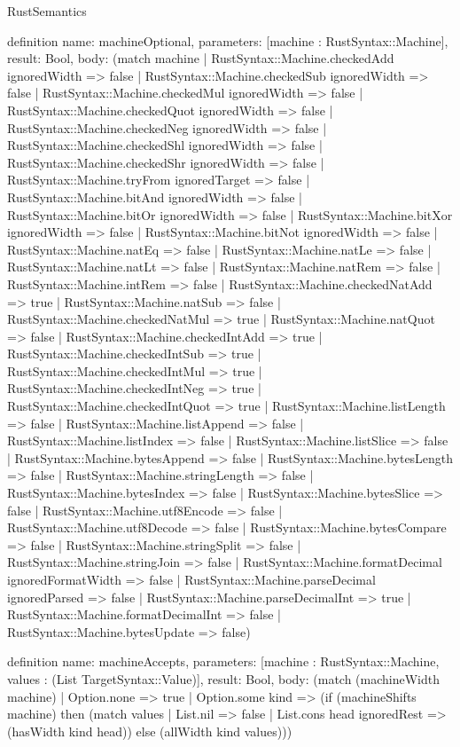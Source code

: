 \begin{lexlean}{RustSemantics}
\begin{semanticmodule}
definition{
  name: machineOptional,
  parameters: [machine : RustSyntax::Machine],
  result: Bool,
  body: (match machine
    | RustSyntax::Machine.checkedAdd ignoredWidth => false
    | RustSyntax::Machine.checkedSub ignoredWidth => false
    | RustSyntax::Machine.checkedMul ignoredWidth => false
    | RustSyntax::Machine.checkedQuot ignoredWidth => false
    | RustSyntax::Machine.checkedNeg ignoredWidth => false
    | RustSyntax::Machine.checkedShl ignoredWidth => false
    | RustSyntax::Machine.checkedShr ignoredWidth => false
    | RustSyntax::Machine.tryFrom ignoredTarget => false
    | RustSyntax::Machine.bitAnd ignoredWidth => false
    | RustSyntax::Machine.bitOr ignoredWidth => false
    | RustSyntax::Machine.bitXor ignoredWidth => false
    | RustSyntax::Machine.bitNot ignoredWidth => false
    | RustSyntax::Machine.natEq => false
    | RustSyntax::Machine.natLe => false
    | RustSyntax::Machine.natLt => false
    | RustSyntax::Machine.natRem => false
    | RustSyntax::Machine.intRem => false
    | RustSyntax::Machine.checkedNatAdd => true
    | RustSyntax::Machine.natSub => false
    | RustSyntax::Machine.checkedNatMul => true
    | RustSyntax::Machine.natQuot => false
    | RustSyntax::Machine.checkedIntAdd => true
    | RustSyntax::Machine.checkedIntSub => true
    | RustSyntax::Machine.checkedIntMul => true
    | RustSyntax::Machine.checkedIntNeg => true
    | RustSyntax::Machine.checkedIntQuot => true
    | RustSyntax::Machine.listLength => false
    | RustSyntax::Machine.listAppend => false
    | RustSyntax::Machine.listIndex => false
    | RustSyntax::Machine.listSlice => false
    | RustSyntax::Machine.bytesAppend => false
    | RustSyntax::Machine.bytesLength => false
    | RustSyntax::Machine.stringLength => false
    | RustSyntax::Machine.bytesIndex => false
    | RustSyntax::Machine.bytesSlice => false
    | RustSyntax::Machine.utf8Encode => false
    | RustSyntax::Machine.utf8Decode => false
    | RustSyntax::Machine.bytesCompare => false
    | RustSyntax::Machine.stringSplit => false
    | RustSyntax::Machine.stringJoin => false
    | RustSyntax::Machine.formatDecimal ignoredFormatWidth => false
    | RustSyntax::Machine.parseDecimal ignoredParsed => false
    | RustSyntax::Machine.parseDecimalInt => true
    | RustSyntax::Machine.formatDecimalInt => false
    | RustSyntax::Machine.bytesUpdate => false)
}

definition{
  name: machineAccepts,
  parameters: [machine : RustSyntax::Machine, values : (List TargetSyntax::Value)],
  result: Bool,
  body: (match (machineWidth machine)
    | Option.none => true
    | Option.some kind => (if (machineShifts machine) then (match values
      | List.nil => false
      | List.cons head ignoredRest => (hasWidth kind head)) else (allWidth kind values)))
}


\end{semanticmodule}
\end{lexlean}
